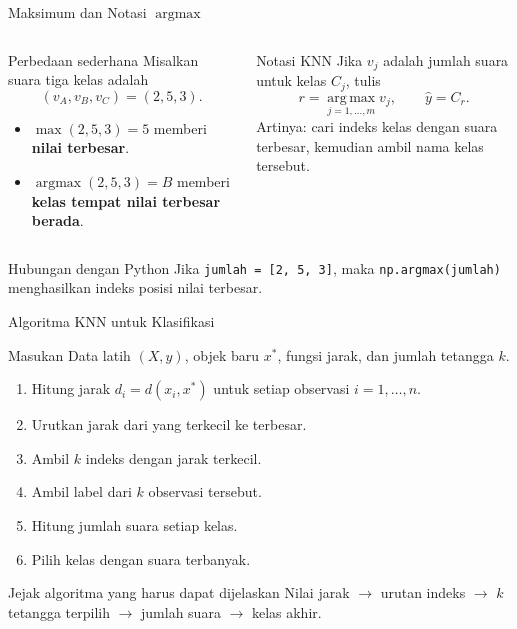 \documentclass[aspectratio=169,11pt]{beamer}
\begin{document}
\begin{frame}{Maksimum dan Notasi \texorpdfstring{$\operatorname{argmax}$}{argmax}}
\begin{columns}[T]
\begin{block}{Perbedaan sederhana}
\small
Misalkan suara tiga kelas adalah
\[
(v_A,v_B,v_C)=(2,5,3).
\]
\begin{itemize}
  \item $\max(2,5,3)=5$ memberi \textbf{nilai terbesar}.
  \item $\operatorname{argmax}(2,5,3)=B$ memberi \textbf{kelas tempat nilai terbesar berada}.
\end{itemize}
\end{block}
\begin{block}{Notasi KNN}
\small
Jika $v_j$ adalah jumlah suara untuk kelas $C_j$, tulis
\[
r=\operatorname*{arg\,max}_{j=1,\ldots,m} v_j,
\qquad
\hat y=C_r.
\]
Artinya: cari indeks kelas dengan suara terbesar, kemudian ambil nama kelas tersebut.
\end{block}
\end{columns}
\begin{alertblock}{Hubungan dengan Python}
\small
Jika \texttt{jumlah = [2, 5, 3]}, maka \texttt{np.argmax(jumlah)} menghasilkan indeks posisi nilai terbesar.
\end{alertblock}
\end{frame}

\begin{frame}{Algoritma KNN untuk Klasifikasi}
\begin{block}{Masukan}
\small Data latih $(X,y)$, objek baru $x^*$, fungsi jarak, dan jumlah tetangga $k$.
\end{block}
\begin{enumerate}\small
  \item Hitung jarak $d_i=d(x_i,x^*)$ untuk setiap observasi $i=1,\ldots,n$.
  \item Urutkan jarak dari yang terkecil ke terbesar.
  \item Ambil $k$ indeks dengan jarak terkecil.
  \item Ambil label dari $k$ observasi tersebut.
  \item Hitung jumlah suara setiap kelas.
  \item Pilih kelas dengan suara terbanyak.
\end{enumerate}
\begin{alertblock}{Jejak algoritma yang harus dapat dijelaskan}
\small
Nilai jarak $\rightarrow$ urutan indeks $\rightarrow$ $k$ tetangga terpilih $\rightarrow$ jumlah suara $\rightarrow$ kelas akhir.
\end{alertblock}
\end{frame}
\end{document}
